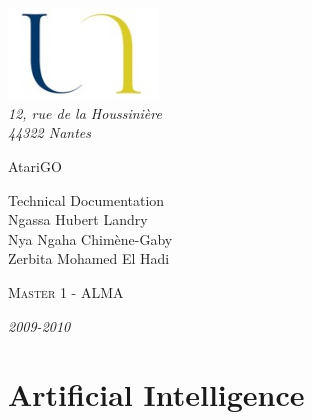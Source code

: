 \documentclass{report}
\begin{document}
\begin{titlepage}


\begin{flushleft}
\includegraphics*[width=4cm]{images/logo.jpg} \\
\textsl{12, rue de la Houssinière}\\
\textit{44322 Nantes}
\hrulefill
\end{flushleft}


\vspace{2cm}


\begin{flushleft}

{\fontsize{1.4cm}{1.65cm}\selectfont AtariGO } \\

\vspace{1cm}

{\Huge Technical Documentation}\\

\vspace{3cm}
{\Large Ngassa Hubert Landry}\\
{\Large Nya Ngaha Chimène-Gaby}\\
{\Large Zerbita Mohamed El Hadi} \\



\end{flushleft}

\vspace{2cm}

\begin{flushleft}
\textsc{Master 1 - ALMA}\\
\hrulefill
\end{flushleft}
\textit{2009-2010}

\end{titlepage}



\tableofcontents
\newpage

\chapter {Artificial Intelligence}
\end{document}
